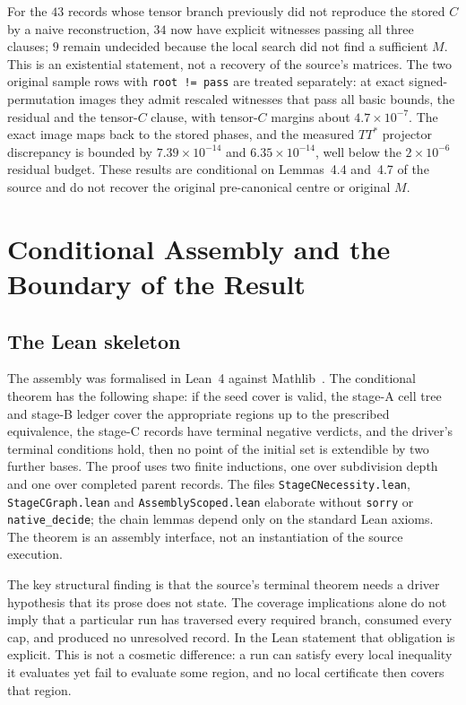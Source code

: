 \documentclass[10pt]{article}
\theoremstyle{definition}
\begin{document}
For the $43$ records whose tensor branch previously did not reproduce the stored $C$ by a naive reconstruction, $34$ now have explicit witnesses passing all three clauses; $9$ remain undecided because the local search did not find a sufficient $M$. This is an existential statement, not a recovery of the source's matrices. The two original sample rows with \texttt{root != pass} are treated separately: at exact signed-permutation images they admit rescaled witnesses that pass all basic bounds, the residual and the tensor-$C$ clause, with tensor-$C$ margins about $4.7\times10^{-7}$. The exact image maps back to the stored phases, and the measured $TT^*$ projector discrepancy is bounded by $7.39\times10^{-14}$ and $6.35\times10^{-14}$, well below the $2\times10^{-6}$ residual budget. These results are conditional on Lemmas~4.4 and~4.7 of the source and do not recover the original pre-canonical centre or original $M$.

\section{Conditional Assembly and the Boundary of the Result}
\label{sec:assembly}

\subsection{The Lean skeleton}

The assembly was formalised in Lean~4 against Mathlib~\cite{Lean,Mathlib}. The conditional theorem has the following shape: if the seed cover is valid, the stage-A cell tree and stage-B ledger cover the appropriate regions up to the prescribed equivalence, the stage-C records have terminal negative verdicts, and the driver's terminal conditions hold, then no point of the initial set is extendible by two further bases. The proof uses two finite inductions, one over subdivision depth and one over completed parent records. The files \texttt{StageCNecessity.lean}, \texttt{StageCGraph.lean} and \texttt{AssemblyScoped.lean} elaborate without \texttt{sorry} or \texttt{native\_decide}; the chain lemmas depend only on the standard Lean axioms. The theorem is an assembly interface, not an instantiation of the source execution.

The key structural finding is that the source's terminal theorem needs a driver hypothesis that its prose does not state. The coverage implications alone do not imply that a particular run has traversed every required branch, consumed every cap, and produced no unresolved record. In the Lean statement that obligation is explicit. This is not a cosmetic difference: a run can satisfy every local inequality it evaluates yet fail to evaluate some region, and no local certificate then covers that region.
\end{document}
